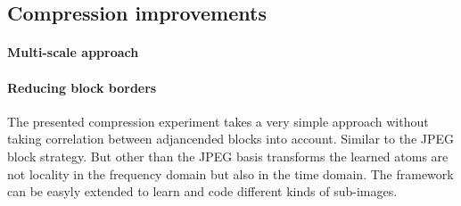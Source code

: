 \subsection{Compression improvements}

\paragraph{Multi-scale approach}
\paragraph{Reducing block borders} The presented compression experiment
takes a very simple approach without taking correlation between adjancended
blocks into account. Similar to the JPEG block strategy. But other than
the JPEG basis transforms the learned atoms are not locality in the frequency
domain but also in the time domain.
The framework can be easyly extended to learn and code different
kinds of sub-images.









